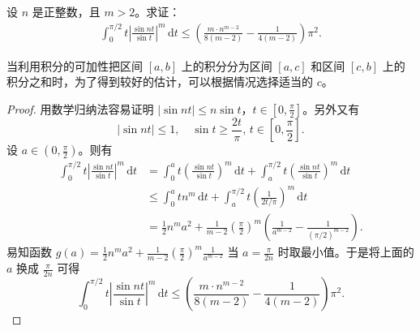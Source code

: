 \documentclass[../../main.tex]{subfiles}
\begin{document}
\begin{example}
设 \( n \) 是正整数，且 \( m > 2 \)。求证：
\begin{align*}
\int_{0}^{\pi/2} t \left| \frac{\sin nt}{\sin t} \right|^m \, \mathrm{d}t \leqslant \left( \frac{m \cdot n^{m - 2}}{8(m - 2)} - \frac{1}{4(m - 2)} \right) \pi^2.
\end{align*}
\end{example}
\begin{remark}
当利用积分的可加性把区间 \( [a, b] \) 上的积分分为区间 \( [a, c] \) 和区间 \( [c, b] \) 上的积分之和时，为了得到较好的估计，可以根据情况选择适当的 \( c \)。
\end{remark}
\begin{proof}
用数学归纳法容易证明 \( |\sin nt| \leqslant n \sin t \)，\( t \in \left[ 0, \frac{\pi}{2} \right] \)。另外又有
\[
|\sin nt| \leqslant 1, \quad \sin t \geqslant \frac{2t}{\pi}, \, t \in \left[ 0, \frac{\pi}{2} \right].
\]
设 \( a \in \left( 0, \frac{\pi}{2} \right) \)。则有
\begin{align*}
\int_{0}^{\pi/2} t \left| \frac{\sin nt}{\sin t} \right|^m \, \mathrm{d}t &= \int_{0}^{a} t \left( \frac{\sin nt}{\sin t} \right)^m \, \mathrm{d}t + \int_{a}^{\pi/2} t \left( \frac{\sin nt}{\sin t} \right)^m \, \mathrm{d}t \\
&\leqslant \int_{0}^{a} tn^m \, \mathrm{d}t + \int_{a}^{\pi/2} t \left( \frac{1}{2t/\pi} \right)^m \, \mathrm{d}t \\
&= \frac{1}{2} n^m a^2 + \frac{1}{m - 2} \left( \frac{\pi}{2} \right)^m \left( \frac{1}{a^{m - 2}} - \frac{1}{(\pi/2)^{m - 2}} \right).
\end{align*}
易知函数 \( g(a) = \frac{1}{2} n^m a^2 + \frac{1}{m - 2} \left( \frac{\pi}{2} \right)^m \frac{1}{a^{m - 2}} \) 当 \( a = \frac{\pi}{2n} \) 时取最小值。于是将上面的 \( a \) 换成 \( \frac{\pi}{2n} \) 可得
\[
\int_{0}^{\pi/2} t \left| \frac{\sin nt}{\sin t} \right|^m \, \mathrm{d}t \leqslant \left( \frac{m \cdot n^{m - 2}}{8(m - 2)} - \frac{1}{4(m - 2)} \right) \pi^2.
\]
\end{proof}
\end{document}
